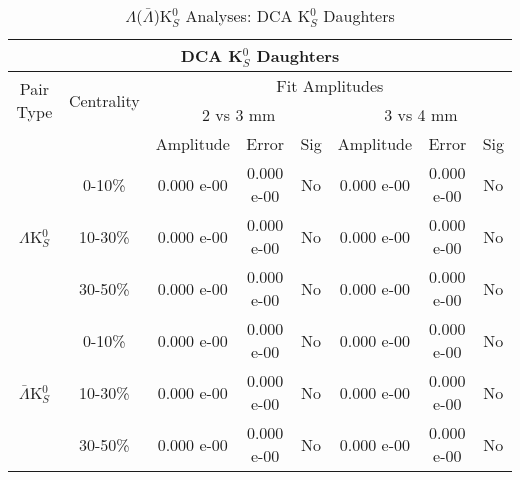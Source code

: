 \documentclass[../AnalysisNoteJBuxton.tex]{subfiles}
\begin{document}
\begin{table}
 \centering
 \begin{tabular}{|c|c|c|c|c||c|c|c|}
  \multicolumn{8}{c}{DCA K$^{0}_{S}$ Daughters} \\
  \hline
  \multirow{2}{*}{Pair Type} & \multirow{2}{*}{Centrality} & \multicolumn{6}{c|}{Fit Amplitudes} \\
  \cline{3-8}
   & & \multicolumn{3}{c||}{2 vs 3 mm} & \multicolumn{3}{c|}{3 vs 4 mm} \\
  \hline
   & & Amplitude & Error & Sig & Amplitude & Error & Sig \\
  \hline  
  \multirow{3}{*}{$\Lambda$K$^{0}_{S}$}  
   &  0-10\% & 0.000 e-00 & 0.000 e-00 & No & 0.000 e-00 & 0.000 e-00 & No \\
   & 10-30\% & 0.000 e-00 & 0.000 e-00 & No & 0.000 e-00 & 0.000 e-00 & No \\
   & 30-50\% & 0.000 e-00 & 0.000 e-00 & No & 0.000 e-00 & 0.000 e-00 & No \\
  \hline  
  \multirow{3}{*}{$\bar{\Lambda}$K$^{0}_{S}$}  
   &  0-10\% & 0.000 e-00 & 0.000 e-00 & No & 0.000 e-00 & 0.000 e-00 & No \\
   & 10-30\% & 0.000 e-00 & 0.000 e-00 & No & 0.000 e-00 & 0.000 e-00 & No \\
   & 30-50\% & 0.000 e-00 & 0.000 e-00 & No & 0.000 e-00 & 0.000 e-00 & No \\
  \hline
 \end{tabular}
 \caption{$\Lambda$($\bar{\Lambda}$)K$^{0}_{S}$ Analyses: DCA K$^{0}_{S}$ Daughters}
 \label{tab:K0DaughtersDcaLamK0}
\end{table}
\end{document}
